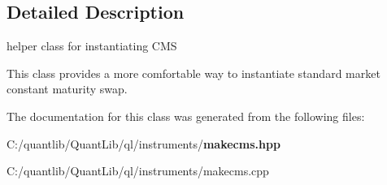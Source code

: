\subsection{Detailed Description}
helper class for instantiating C\+MS 

This class provides a more comfortable way to instantiate standard market constant maturity swap. 

The documentation for this class was generated from the following files\+:\begin{DoxyCompactItemize}
\item 
C\+:/quantlib/\+Quant\+Lib/ql/instruments/{\bf makecms.\+hpp}\item 
C\+:/quantlib/\+Quant\+Lib/ql/instruments/makecms.\+cpp\end{DoxyCompactItemize}

